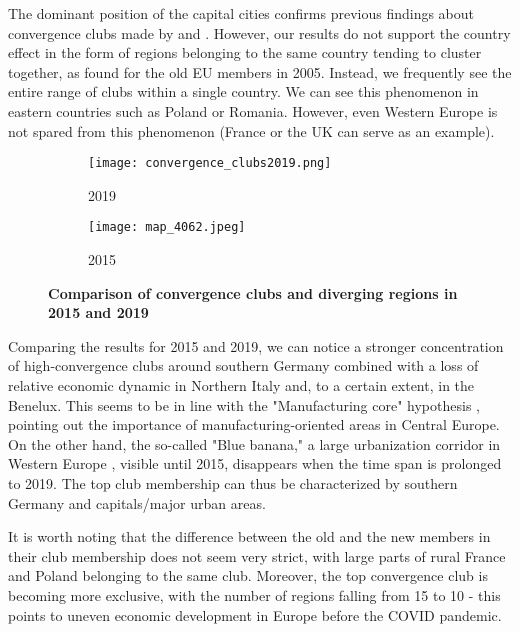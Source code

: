 \documentclass[11pt]{article}
\begin{document}
The dominant position of the capital cities confirms previous findings about convergence clubs made by \citet{sme2012regional} and \citet{bartkowska2012regional}. However, our results do not support the country effect in the form of regions belonging to the same country tending to cluster together, as \citet{bartkowska2012regional} found for the old EU members in 2005. Instead, we frequently see the entire range of clubs within a single country. We can see this phenomenon in eastern countries such as Poland or Romania. However,
even Western Europe is not spared from this phenomenon (France or the UK can serve as an example).


\begin{figure}[!htbp]%
\centering
\begin{subfigure}[c]{0.77\linewidth}
  {
  \texttt{[image: convergence\_clubs2019.png]}
    \caption{2019}
    \label{clubs_graphic_2019}
  }
\end{subfigure}
\qquad
\begin{subfigure}[c]{0.77\linewidth}
  \texttt{[image: map\_4062.jpeg]}
  \caption{2015}
  \label{clubs_graphic_2015}
\end{subfigure}
  \caption{\textbf{Comparison of convergence clubs and diverging regions in 2015 and 2019}}
\label{clubs_graphic}
\end{figure} 


Comparing the results for 2015 and 2019, we can notice a stronger concentration of high-convergence clubs around southern Germany combined with a loss of relative economic dynamic in Northern Italy and, to a certain extent, in the Benelux. This seems to be in line with the "Manufacturing core" hypothesis \citep{cutrini2019economic, stollinger2016structural}, pointing out the importance of manufacturing-oriented areas in Central Europe. On the other hand, the so-called "Blue banana," a large urbanization corridor in Western Europe \citep{hospers2002beyond}, visible until 2015, disappears when the time span is prolonged to 2019. The top club membership can thus be characterized by southern Germany and capitals/major urban areas.

It is worth noting that the difference between the old and the new members in their club membership does not seem very strict, with large parts of rural France and Poland belonging to the same club. Moreover, the top convergence club is becoming more exclusive, with the number of regions falling from 15 to 10 - this points to uneven economic development in Europe before the COVID pandemic.
\end{document}
